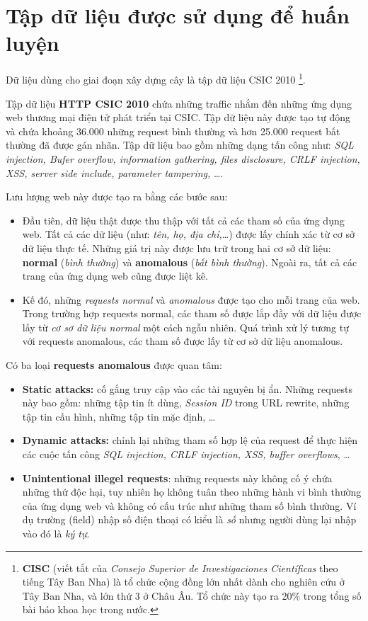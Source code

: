 \documentclass[../main-report.tex]{subfiles}
\begin{document}
\section{Tập dữ liệu được sử dụng để huấn luyện}
Dữ liệu dùng cho giai đoạn xây dựng cây là tập dữ liệu CSIC 2010 \footnote{\textbf{CISC} (viết tắt của \emph{Consejo Superior de Investigaciones Científicas} theo tiếng Tây Ban Nha) là tổ chức cộng đồng lớn nhất dành cho nghiên cứu ở Tây Ban Nha, và lớn thứ 3 ở Châu Âu. Tổ chức này tạo ra 20\% trong tổng số bài báo khoa học trong nước.}.

Tập dữ liệu \textbf{HTTP CSIC 2010} chứa những traffic nhắm đến những ứng dụng web thương mại điện tử phát triển tại CSIC. Tập dữ liệu này được tạo tự động và chứa khoảng 36.000 những request bình thường và hơn 25.000 request bất thường đã được gán nhãn. Tập dữ liệu bao gồm những dạng tấn công như: \emph{SQL injection, Bufer overflow, information gathering, files disclosure, CRLF injection, XSS, server side include, parameter tampering,} \ldots.

Lưu lượng web này được tạo ra bằng các bước sau:

\begin{itemize}
\item Đầu tiên, dữ liệu thật được thu thập với tất cả các tham số của ứng dụng web. Tất cả các dữ liệu (như: \emph{tên, họ, địa chỉ,}\ldots) được lấy chính xác từ cơ sở dữ liệu thực tế. Những giá trị này được lưu trữ trong hai cơ sở dữ liệu: \textbf{normal} (\emph{bình thường}) và \textbf{anomalous} (\emph{bất bình thường}). Ngoài ra, tất cả các trang của ứng dụng web cũng được liệt kê.

\item Kế đó, những \emph{requests normal} và \emph{anomalous} được tạo cho mỗi trang của web. Trong trường hợp requests normal, các tham số được lắp đầy với dữ liệu được lấy từ \emph{cơ sơ dữ liệu normal} một cách ngẫu nhiên. Quá trình xử lý tương tự với requests anomalous, các tham số được lấy từ cơ sở dữ liệu anomalous.
\end{itemize}

Có ba loại \textbf{requests anomalous} được quan tâm:

\begin{itemize}
\item \textbf{Static attacks:} cố gắng truy cập vào các tài nguyên bị ẩn. Những requests này bao gồm: những tập tin ít dùng, \emph{Session ID} trong URL rewrite, những tập tin cấu hình, những tập tin mặc định, \ldots
\item \textbf{Dynamic attacks:} chỉnh lại những tham số hợp lệ của request để thực hiện các cuộc tấn công \emph{SQL injection, CRLF injection, XSS, buffer overflows}, \ldots
\item \textbf{Unintentional illegel requests}: những requests này không cố ý chứa những thứ độc hại, tuy nhiên họ không tuân theo những hành vi bình thường của ứng dụng web và không có cấu trúc như những tham số bình thường. Ví dụ trường (field) nhập số điện thoại có kiểu là \emph{số} nhưng người dùng lại nhập vào đó là \emph{ký tự}.
\end{itemize}
\end{document}
